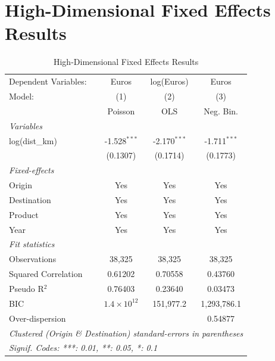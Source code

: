 \documentclass{article}
\begin{document}
\section*{High-Dimensional Fixed Effects Results}
\begin{table}[htbp]
   \caption{High-Dimensional Fixed Effects Results}
   \centering
   \begin{tabular}{lccc}
      \tabularnewline \midrule \midrule
      Dependent Variables: & Euros                & log(Euros)     & Euros\\  
      Model:               & (1)                  & (2)            & (3)\\  
                           &  Poisson             & OLS            & Neg. Bin.\\  
      \midrule
      \emph{Variables}\\
      log(dist\_km)        & -1.528$^{***}$       & -2.170$^{***}$ & -1.711$^{***}$\\   
                           & (0.1307)             & (0.1714)       & (0.1773)\\   
      \midrule
      \emph{Fixed-effects}\\
      Origin               & Yes                  & Yes            & Yes\\  
      Destination          & Yes                  & Yes            & Yes\\  
      Product              & Yes                  & Yes            & Yes\\  
      Year                 & Yes                  & Yes            & Yes\\  
      \midrule
      \emph{Fit statistics}\\
      Observations         & 38,325               & 38,325         & 38,325\\  
      Squared Correlation  & 0.61202              & 0.70558        & 0.43760\\  
      Pseudo R$^2$         & 0.76403              & 0.23640        & 0.03473\\  
      BIC                  & $1.4\times 10^{12}$  & 151,977.2      & 1,293,786.1\\  
      Over-dispersion      &                      &                & 0.54877\\  
      \midrule \midrule
      \multicolumn{4}{l}{\emph{Clustered (Origin \& Destination) standard-errors in parentheses}}\\
      \multicolumn{4}{l}{\emph{Signif. Codes: ***: 0.01, **: 0.05, *: 0.1}}\\
   \end{tabular}
\end{table}
\end{document}
